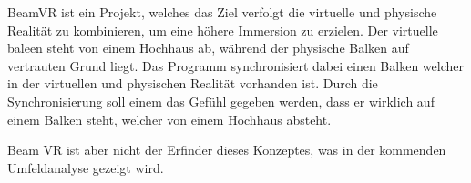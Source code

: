 BeamVR ist ein Projekt, welches das Ziel verfolgt die virtuelle und physische Realität zu kombinieren,
um eine höhere Immersion zu erzielen.
Der virtuelle baleen steht von einem Hochhaus ab, während der physische Balken auf vertrauten Grund liegt.
Das Programm synchronisiert dabei einen Balken welcher in der virtuellen und physischen Realität vorhanden ist.
Durch die Synchronisierung soll einem das Gefühl gegeben werden, dass er wirklich auf einem Balken steht, welcher von
einem Hochhaus absteht.

Beam VR ist aber nicht der Erfinder dieses Konzeptes, was in der kommenden Umfeldanalyse gezeigt wird.
